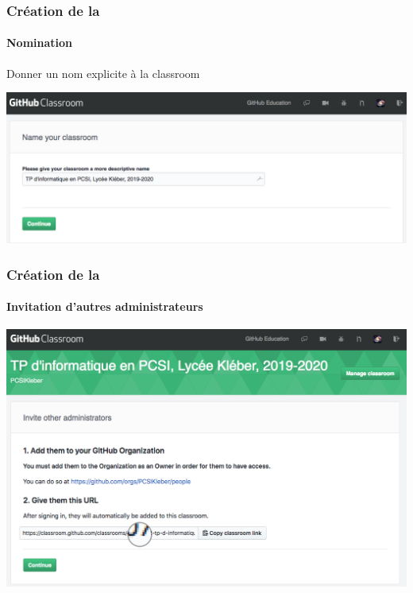 \begin{frame}
	\frametitle{Création de la }
	\framesubtitle{Nomination}

	Donner un nom explicite à la classroom

	\begin{center}
		\includegraphics[width=\linewidth]{figures/classroom_naming.png}
	\end{center}

\end{frame}

\begin{frame}
	\frametitle{Création de la }
	\framesubtitle{Invitation d'autres administrateurs}


	\begin{center}
		\includegraphics[width=\linewidth]{figures/classroom_invite_admin.png}
	\end{center}

\end{frame}

